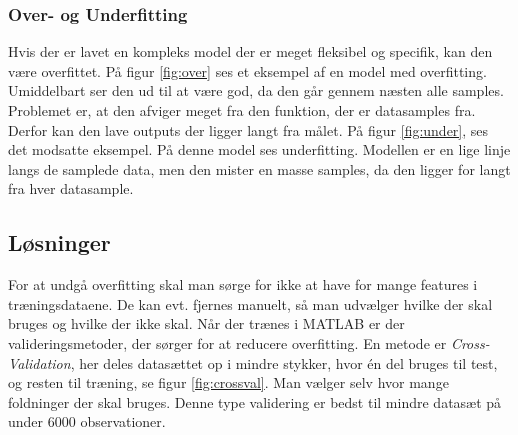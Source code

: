 \subsubsection{Over- og Underfitting}
Hvis der er lavet en kompleks model der er meget fleksibel og specifik, kan den være overfittet. På figur \ref{fig:over}\citep{fitting} ses et eksempel af en model med overfitting. Umiddelbart ser den ud til at være god, da den går gennem næsten alle samples. Problemet er, at den afviger meget fra den funktion, der er datasamples fra. Derfor kan den lave outputs der ligger langt fra målet. På figur \ref{fig:under}, ses det modsatte eksempel. På denne model ses underfitting. Modellen er en lige linje langs de samplede data, men den mister en masse samples, da den ligger for langt fra hver datasample.






\subsection{Løsninger}
For at undgå overfitting skal man sørge for ikke at have for mange features i træningsdataene. De kan evt. fjernes manuelt, så man udvælger hvilke der skal bruges og hvilke der ikke skal.
Når der trænes i MATLAB er der valideringsmetoder, der sørger for at reducere overfitting.
En metode er \textit{Cross-Validation}, her deles datasættet op i mindre stykker, hvor én del bruges til test, og resten til træning, se figur \ref{fig:crossval}. Man vælger selv hvor mange foldninger der skal bruges. Denne type validering er bedst til mindre datasæt på under 6000 observationer.


